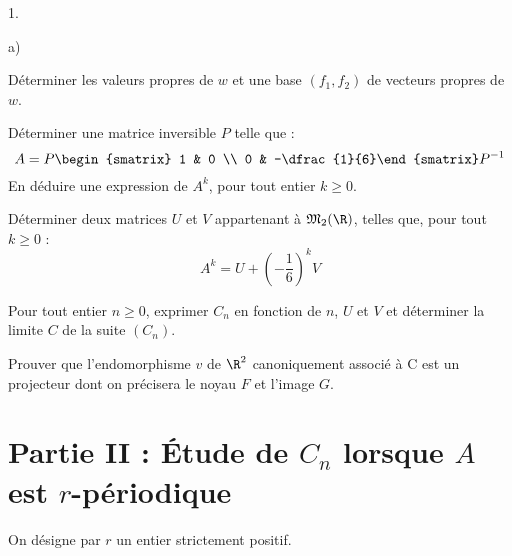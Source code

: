 \documentclass[11pt]{article}%
\begin{document}
\begin{noliste}{1.}
\begin{noliste}{a)}
 \setlength{\itemsep}{2mm}
\item Déterminer les valeurs propres de $w$ et une base $(f_{1},f_{2})$
de
vecteurs propres de $w$. 

\item Déterminer une matrice inversible $P$ telle que : 
\[
A = P
\begin{smatrix}
1 & 0 \\
0 & -\dfrac{1}{6}\end{smatrix}
P^{-1}
\]
En déduire une expression de $A^{k}$, pour tout entier $k\geq 0$. 

\item Déterminer deux matrices $U$ et $V$ appartenant à
$\mathfrak{M}_{2}(\R)$, telles que, pour tout $k\geq 0$ : 
\[
A^{k} = U + \left( -\dfrac{1}{6}\right) ^{k}V
\]

\item Pour tout entier $n\geq 0$, exprimer $C_{n}$ en fonction de $n$,
$U$ et $V$ et déterminer la limite $C$ de la suite $(C_{n})$. 

\item Prouver que l'endomorphisme $v$ de $\R^{2}$ canoniquement
associé à C est un projecteur dont on précisera le noyau $F$ et l'image
$G$. 
\end{noliste}
\end{noliste}

\section*{Partie II : Étude de $C_{n}$ lorsque $A$ est $r$-périodique }

On désigne par $r$ un entier strictement positif. 
\end{document}
